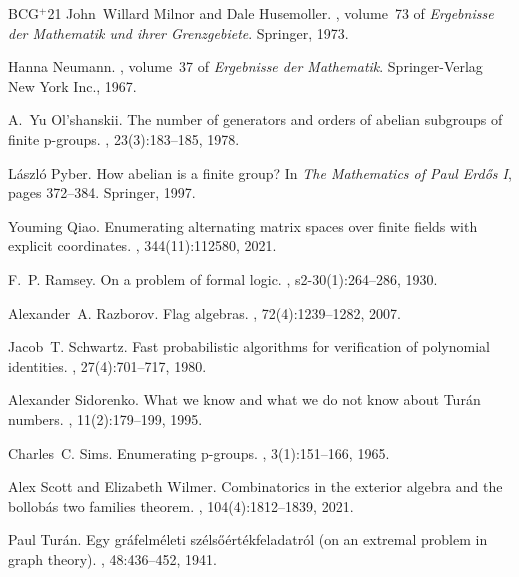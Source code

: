 \documentclass[10pt]{article}
\newcommand{\etalchar}[1]{$^{#1}$}
\begin{document}
\begin{thebibliography}{BCG{\etalchar{+}}21}
John~Willard Milnor and Dale Husemoller.
, volume~73 of {\em Ergebnisse der
  Mathematik und ihrer Grenzgebiete}.
\newblock Springer, 1973.

Hanna Neumann.
, volume~37 of {\em Ergebnisse der
  Mathematik}.
\newblock Springer-Verlag New York Inc., 1967.

A.~Yu Ol'shanskii.
\newblock The number of generators and orders of abelian subgroups of finite
  p-groups.
,
  23(3):183--185, 1978.

L{\'a}szl{\'o} Pyber.
\newblock How abelian is a finite group?
\newblock In {\em The Mathematics of Paul Erd\H{o}s I}, pages 372--384.
  Springer, 1997.

Youming Qiao.
\newblock Enumerating alternating matrix spaces over finite fields with
  explicit coordinates.
, 344(11):112580, 2021.

F.~P. Ramsey.
\newblock On a problem of formal logic.
,
  s2-30(1):264--286, 1930.

Alexander~A. Razborov.
\newblock Flag algebras.
, 72(4):1239--1282, 2007.

Jacob~T. Schwartz.
\newblock Fast probabilistic algorithms for verification of polynomial
  identities.
, 27(4):701--717, 1980.

Alexander Sidorenko.
\newblock What we know and what we do not know about {Tur{\'a}n} numbers.
, 11(2):179--199, 1995.

Charles~C. Sims.
\newblock Enumerating p-groups.
, 3(1):151--166,
  1965.

Alex Scott and Elizabeth Wilmer.
\newblock Combinatorics in the exterior algebra and the bollob{\'a}s two
  families theorem.
, 104(4):1812--1839,
  2021.

Paul Tur{\'a}n.
\newblock Egy gr\'afelm\'eleti sz\'els{\H{o}}\'ert\'ekfeladatr\'ol (on an
  extremal problem in graph theory).
, 48:436--452, 1941.


\end{thebibliography}
\end{document}
